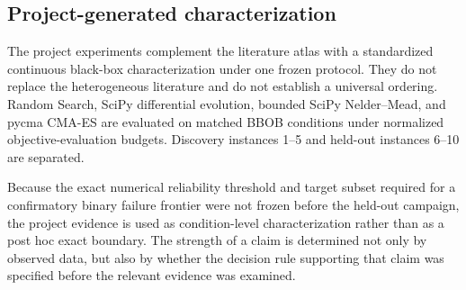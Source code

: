 \subsection{Project-generated characterization}

The project experiments complement the literature atlas with a standardized continuous black-box characterization under one frozen protocol. They do not replace the heterogeneous literature and do not establish a universal ordering. Random Search, SciPy differential evolution, bounded SciPy Nelder--Mead, and pycma CMA-ES are evaluated on matched BBOB conditions under normalized objective-evaluation budgets. Discovery instances 1--5 and held-out instances 6--10 are separated.

Because the exact numerical reliability threshold and target subset required for a confirmatory binary failure frontier were not frozen before the held-out campaign, the project evidence is used as condition-level characterization rather than as a post hoc exact boundary. The strength of a claim is determined not only by observed data, but also by whether the decision rule supporting that claim was specified before the relevant evidence was examined.
